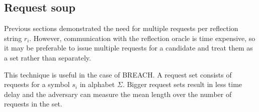 \subsection{Request soup}
Previous sections demonstrated the need for multiple requests per reflection
string $r_i$. However, communication with the reflection oracle is time
expensive, so it may be preferable to issue multiple requests for a candidate
and treat them as a set rather than separately.

This technique is useful in the case of BREACH. A request set consists of
requests for a symbol $s_i$ in alphabet $\Sigma$. Bigger request sets result in
less time delay and the adversary can measure the mean length over the number of
requests in the set.
